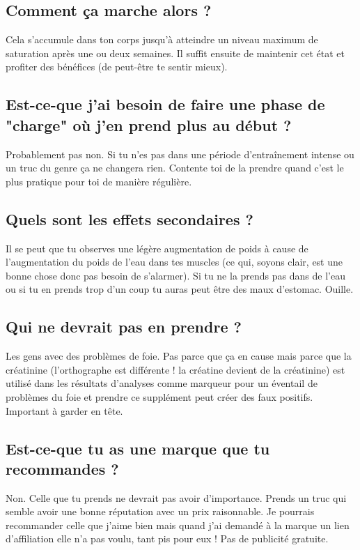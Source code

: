 \documentclass{article}
\begin{document}
\subsection{Comment ça marche alors ?}

Cela s'accumule dans ton corps jusqu'à atteindre un niveau maximum de saturation après une ou deux semaines. Il suffit ensuite de maintenir cet état et profiter des bénéfices (de peut-être te sentir mieux).

\subsection{Est-ce-que j'ai besoin de faire une phase de "charge" où j'en prend plus au début ?}

Probablement pas non. Si tu n'es pas dans une période d'entraînement intense ou un truc du genre ça ne changera rien. Contente toi de la prendre quand c'est le plus pratique pour toi de manière régulière.

\subsection{Quels sont les effets secondaires ?}

Il se peut que tu observes une légère augmentation de poids à cause de l'augmentation du poids de l'eau dans tes muscles (ce qui, soyons clair, est une bonne chose donc pas besoin de s'alarmer). Si tu ne la prends pas dans de l'eau ou si tu en prends trop d'un coup tu auras peut être des maux d'estomac. Ouille.

\subsection{Qui ne devrait pas en prendre ?}

Les gens avec des problèmes de foie. Pas parce que ça en cause mais parce que la créatinine (l'orthographe est différente ! la créatine devient de la créatinine) est utilisé dans les résultats d'analyses comme marqueur pour un éventail de problèmes du foie et prendre ce supplément peut créer des faux positifs. Important à garder en tête.

\subsection{Est-ce-que tu as une marque que tu recommandes ?}

Non. Celle que tu prends ne devrait pas avoir d'importance. Prends un truc qui semble avoir une bonne réputation avec un prix raisonnable. Je pourrais recommander celle que j'aime bien mais quand j'ai demandé à la marque un lien d'affiliation elle n'a pas voulu, tant pis pour eux ! Pas de publicité gratuite. 
\end{document}
